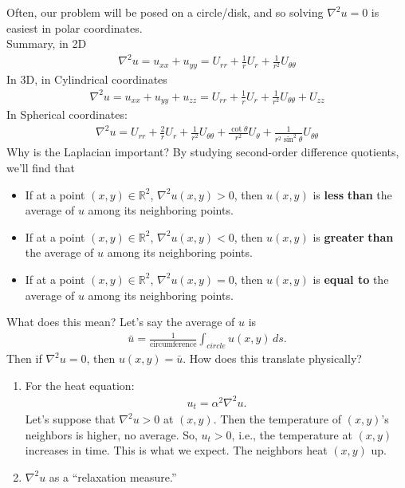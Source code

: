 \documentclass{article}
\theoremstyle{definition}
\newcommand{\R}{\mathbb{R}}
\newcommand{\f}[2]{\frac{#1}{#2}}
\begin{document}
Often, our problem will be posed on a circle/disk, and so solving $\nabla^2 u = 0$ is easiest in polar coordinates. \\

Summary, in 2D
\begin{align*}
\boxed{\nabla^2 u = u_{xx}  + u_{yy} = U_{rr} + \f{1}{r}U_r + \f{1}{r^2}U_{\theta\theta}}
\end{align*}
In 3D, in Cylindrical coordinates
\begin{align*}
\boxed{\nabla^2 u = u_{xx}  + u_{yy} + u_{zz} = U_{rr} + \f{1}{r}U_r + \f{1}{r^2} U_{\theta\theta} + U_{zz} }
\end{align*}
In Spherical coordinates:
\begin{align*}
\boxed{\nabla^2 u  = U_{rr} + \f{2}{r}U_r  +\f{1}{r^2}U_{\theta\theta} + \f{\cot\theta}{r^2}U_\theta + \f{1}{r^2\sin^2\theta}U_{\theta\theta}  }
\end{align*}
Why is the Laplacian important? By studying second-order difference quotients, we'll find that
\begin{itemize}
	\item If at a point $(x,y)\in\R^2$, $\nabla^2 u(x,y) > 0$, then $u(x,y)$ is \textbf{less} \textbf{than} the average of $u$ among its neighboring points.
	\item If at a point $(x,y)\in\R^2$, $\nabla^2 u(x,y) < 0$, then $u(x,y)$ is \textbf{greater} \textbf{than} the average of $u$ among its neighboring points.
	\item If at a point $(x,y)\in\R^2$, $\nabla^2 u(x,y) = 0$, then $u(x,y)$ is \textbf{equal to} the average of $u$ among its neighboring points.
\end{itemize}

What does this mean? Let's say the average of $u$ is 
\begin{align*}
\bar{u} = \f{1}{\text{circumference}}\int_{circle} u(x,y)\,ds.
\end{align*}
Then if $\nabla^2 u = 0$, then $u(x,y) = \bar{u}$. How does this translate physically? 
\begin{enumerate}
	\item For the heat equation: 
	\begin{align*}
	u_t = \alpha^2 \nabla^2 u.
	\end{align*}
	Let's suppose that $\nabla^2 u > 0$ at $(x,y)$. Then the temperature of $(x,y)$'s neighbors is higher, no average. So, $u_t > 0$, i.e., the temperature at $(x,y)$ increases in time. This is what we expect. The neighbors heat $(x,y)$ up. \\
	\item $\nabla^2 u$ as a ``relaxation measure.''
\end{enumerate}
\end{document}

